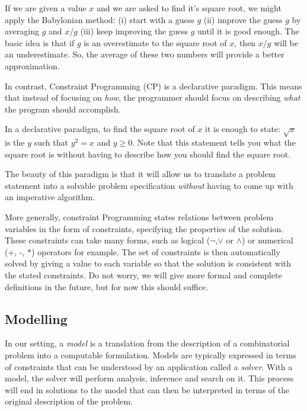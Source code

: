 \begin{example}
If we are given a value $x$ and we are asked to find it's square root, we might
apply the Babylonian method: (i) start with a guess $g$ (ii) improve the
guess $g$ by averaging $g$ and $x/g$ (iii) keep improving the guess $g$
until it is good enough.
%
The basic idea is that if $g$ is an overestimate to the square root of $x$,
then $x/g$ will be an underestimate. So, the average of these two numbers will
provide a better approximation.
\end{example}

In contrast, Constraint Programming (CP) is a declarative paradigm. This means
that instead of focusing on \emph{how}, the programmer should focus on describing
\emph{what} the program should accomplish. 

\begin{example}
In a declarative paradigm, to find the square root of $x$ it is enough to 
state: $\sqrt{x}$ is the $y$ such that $y^2 = x$ and $y \geq 0$.
%
Note that this statement tells you what the square root is without having to
describe how you should find the square root. 
\end{example}

The beauty of this paradigm is that it will allow us to translate a problem
statement into a solvable problem specification \emph{without} having to come
up with an imperative algorithm. 


More generally, constraint Programming states relations between problem
variables in the form of constraints, specifying the properties of the
solution. These constraints can take many forms, such as logical ($\neg$,$\vee$
or $\wedge$) or numerical (+, -, $*$) operators for example.
%
The set of constraints is then automatically solved by giving a value to each
variable so that the solution is consistent with the stated constraints.  Do
not worry, we will give more formal and complete definitions in the future, but
for now this should suffice.

\subsection{Modelling}

In our setting, a \emph{model} is a translation from the description of a
combinatorial problem into a computable formulation. Models are typically
expressed in terms of constraints that can be understood by an application
called a \emph{solver}. With a model, the solver will perform analysis, 
inference and search on it. This process will end in solutions to the model that
can then be interpreted in terms of the original description of the problem. 

